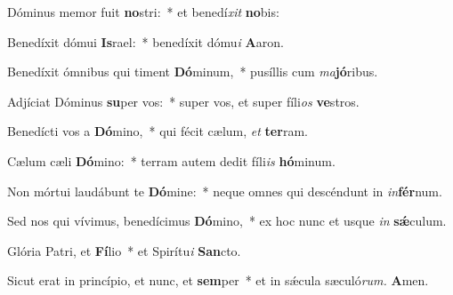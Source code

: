 \item Dóminus memor fuit \textbf{no}stri:~* et benedí\tinyhspace\textit{xit} \textbf{no}bis:
\item Benedíxit dómui \textbf{Is}rael:~* benedíxit dómu\textit{i} \textbf{A}aron.
\item  Benedíxit ómnibus qui timent \textbf{Dó}minum,~* pusíllis cum \textit{ma}\textbf{jó}ribus.
\item Adjíciat Dóminus \textbf{su}per vos:~* super vos, et super fíli\textit{os} \textbf{ve}stros.
\item Benedícti vos a \textbf{Dó}mino,~* qui fécit cælum, \textit{et} \textbf{ter}ram.
\item Cælum cæli \textbf{Dó}mino:~* terram autem dedit fíli\textit{is} \textbf{hó}minum.
\item Non mórtui laudábunt te \textbf{Dó}mine:~* neque omnes qui descéndunt in \textit{in}\textbf{fér}num.
\item Sed nos qui vívimus, benedícimus \textbf{Dó}mino,~* ex hoc nunc et usque \textit{in} \textbf{sǽ}culum.
\item Glória Patri, et \textbf{Fí}lio~* et Spirítu\textit{i} \textbf{San}cto.
\item Sicut erat in princípio, et nunc, et \textbf{sem}per~* et in sǽcula sæculó\textit{rum.} \textbf{A}men.

